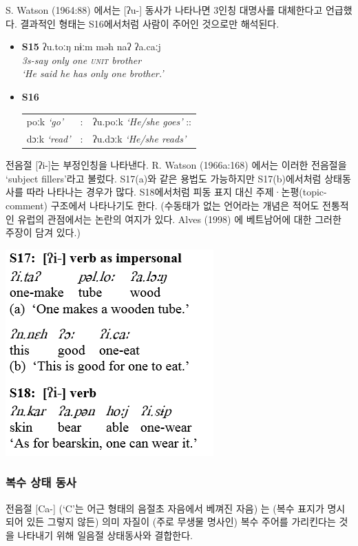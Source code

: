 S. Watson (1964:88) 에서는 [ʔu-] 동사가 나타나면 3인칭 대명사를 대체한다고 언급했다. 결과적인 형태는 S16에서처럼 사람이 주어인 것으로만 해석된다.
\begin{itemize}
\item \textbf{S15}
\gll ʔu.toːŋ nɨːm məh naʔ ʔa.caːj\\
\itshape{3s-say} \itshape{only} \itshape{one} \textsc{unit} \itshape{brother} \\
`He said he has only one brother.'

\item \textbf{S16}

\begin{tabular}{lcl}
poːk {\itshape{`go'}} & : & ʔu.poːk {\itshape{`He/she goes'}} :: \\
dɔːk {\itshape{`read'}} & : & ʔu.dɔːk {\itshape{`He/she reads'}}
\end{tabular}
\end{itemize}

전음절 [ʔi-]는 부정인칭을 나타낸다. R. Watson (1966a:168) 에서는 이러한 전음절을 `subject fillers'라고 불렀다. S17(a)와 같은 용법도 가능하지만 S17(b)에서처럼 상태동사를 따라 나타나는 경우가 많다. S18에서처럼 피동 표지 대신 주제·논평(topic-comment) 구조에서 나타나기도 한다. (수동태가 없는 언어라는 개념은 적어도 전통적인 유럽의 관점에서는 논란의 여지가 있다. Alves (1998) 에 베트남어에 대한 그러한 주장이 담겨 있다.)

\includegraphics{Pacoh/src/PacohS17.png}

\subsubsection{복수 상태 동사}

전음절 [Ca-] (`C'는 어근 형태의 음절초 자음에서 베껴진 자음) 는 (복수 표지가 명시되어 있든 그렇지 않든) 의미 자질이 (주로 무생물 명사인) 복수 주어를 가리킨다는 것을 나타내기 위해 
일음절 상태동사와 결합한다.

